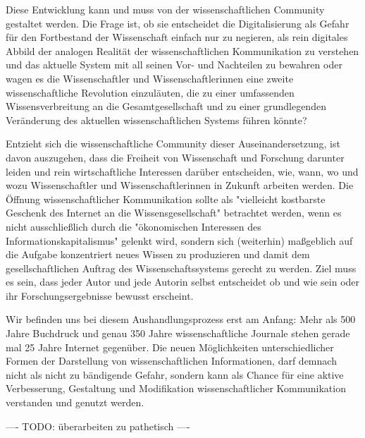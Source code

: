 Diese Entwicklung kann und muss von der wissenschaftlichen Community gestaltet werden. Die Frage ist, ob sie entscheidet die Digitalisierung als Gefahr für den Fortbestand der Wissenschaft einfach nur zu negieren, als rein digitales Abbild der analogen Realität der wissenschaftlichen Kommunikation zu verstehen und das aktuelle System mit all seinen Vor- und Nachteilen zu bewahren oder wagen es die Wissenschaftler und Wissenschaftlerinnen eine zweite wissenschaftliche Revolution einzuläuten, die zu einer umfassenden Wissensverbreitung an die Gesamtgesellschaft und zu einer grundlegenden Veränderung des aktuellen wissenschaftlichen Systems führen könnte?

Entzieht sich die wissenschaftliche Community dieser Auseinandersetzung, ist davon auszugehen, dass die Freiheit von Wissenschaft und Forschung darunter leiden und rein wirtschaftliche Interessen darüber entscheiden, wie, wann, wo und wozu Wissenschaftler und Wissenschaftlerinnen in Zukunft arbeiten werden. Die Öffnung wissenschaftlicher Kommunikation sollte als "vielleicht kostbarste Geschenk des Internet an die Wissensgesellschaft" betrachtet werden, wenn es nicht ausschließlich durch die "ökonomischen Interessen des Informationskapitalismus" \cite{hagner_2015_sache_buches} gelenkt wird, sondern sich (weiterhin) maßgeblich auf die Aufgabe konzentriert neues Wissen zu produzieren und damit dem gesellschaftlichen Auftrag des Wissenschaftssystems gerecht zu werden. Ziel muss es sein, dass jeder Autor und jede Autorin selbst entscheidet ob und wie sein oder ihr Forschungsergebnisse bewusst erscheint.

Wir befinden uns bei diesem Aushandlungsprozess erst am Anfang: Mehr als 500 Jahre Buchdruck und genau 350 Jahre wissenschaftliche Journale stehen gerade mal 25 Jahre Internet gegenüber. Die neuen Möglichkeiten unterschiedlicher Formen der Darstellung von wissenschaftlichen Informationen, darf demnach nicht als nicht zu bändigende Gefahr, sondern kann als Chance für eine aktive Verbesserung, Gestaltung und Modifikation wissenschaftlicher Kommunikation verstanden und genutzt werden.

---- TODO: überarbeiten zu pathetisch ----
